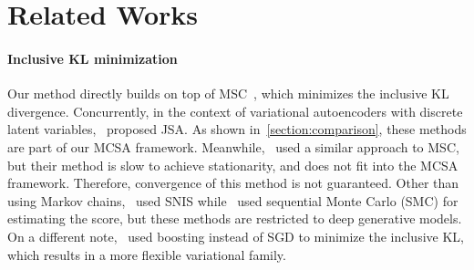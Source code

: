 \vspace{-0.05in}
\section{Related Works}\label{section:related}
\vspace{-0.05in}
\paragraph{Inclusive KL minimization}
Our method directly builds on top of MSC~\citep{NEURIPS2020_b2070693}, which minimizes the inclusive KL divergence.
Concurrently, in the context of variational autoencoders with discrete latent variables,~\citet{pmlr-v124-ou20a} proposed JSA.
As shown in~\cref{section:comparison}, these methods are part of our MCSA framework.
Meanwhile,~\citet{li_approximate_2017} used a similar approach to MSC, but their method is slow to achieve stationarity, and does not fit into the MCSA framework. 
Therefore, convergence of this method is not guaranteed.
Other than using Markov chains,~\citet{DBLP:journals/corr/BornscheinB14,le_revisiting_2019} used SNIS while~\citet{pmlr-v119-wu20h} used sequential Monte Carlo (SMC) for estimating the score, but these methods are restricted to deep generative models.
On a different note,~\citet{pmlr-v161-jerfel21a} used boosting instead of SGD to minimize the inclusive KL, which results in a more flexible variational family.

\vspace{-0.1in}
